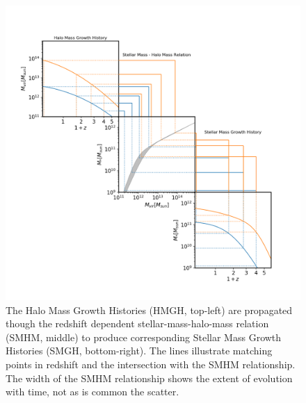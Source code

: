 \begin{figure}[h]
	\centering
	\includegraphics[width = \linewidth]{Figures/Chapter2/HMGH_to_SMGH.png}
    \caption{The Halo Mass Growth Histories (HMGH, top-left) are propagated though the redshift dependent stellar-mass-halo-mass relation (SMHM, middle) to produce corresponding Stellar Mass Growth Histories (SMGH, bottom-right). The lines illustrate matching points in redshift and the intersection with the SMHM relationship. The width of the SMHM relationship shows the extent of evolution with time, not as is common the scatter.}
	\label{fig:Cont_Eqn}
\end{figure}
